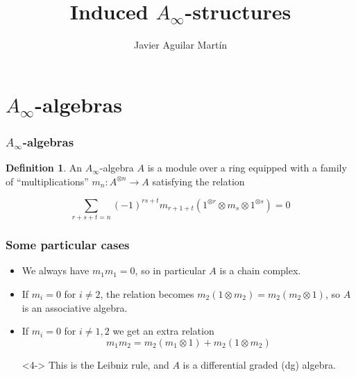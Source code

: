 \documentclass{beamer}
\title{Induced $A_\infty$-structures}
\author{Javier Aguilar Mart\'in}
\institute{University of Kent}
\date{}
\theoremstyle{definition}
\newtheorem{defi}{Definition}
\begin{document}
\frame{\titlepage}
%
% 
% 
% 

% 



\newcommand{\seti}{\setcounter{saveenumi}{\value{enumi}}}
\newcommand{\conti}{\setcounter{enumi}{\value{saveenumi}}}

\makeatletter
\newcommand{\xRightarrow}[2][]{\ext@arrow 0359\Rightarrowfill@{#1}{#2}}
\makeatother

\section{$A_\infty$-algebras}
\begin{frame}
\frametitle{$A_\infty$-algebras}
\begin{defi}
An $A_\infty$-algebra $A$ is a module over a ring equipped with a family of ``multiplications'' $m_n:A^{\otimes n}\to A$ satisfying the relation

$$\sum_{r+s+t=n}(-1)^{rs+t}m_{r+1+t}(1^{\otimes r}\otimes m_s\otimes 1^{\otimes s})=0$$ %
\end{defi}
\end{frame}





\begin{frame}
\frametitle{Some particular cases}
\begin{itemize}
\item<1-> We always have $m_1m_1=0$, so in particular $A$ is a chain complex.
\item<2-> If $m_i=0$ for $i\neq 2$, the relation becomes $m_2(1\otimes m_2)=m_2(m_2\otimes 1)$, so $A$ is an associative algebra.
\item<3-> If $m_i=0$ for $i\neq 1,2$ we get an extra relation $$m_1m_2=m_2(m_1\otimes 1)+m_2(1\otimes m_2)$$ 
\item[]<4-> This is the Leibniz rule, and $A$ is a differential graded (dg) algebra.
\end{itemize}
\end{frame}
\end{document}
